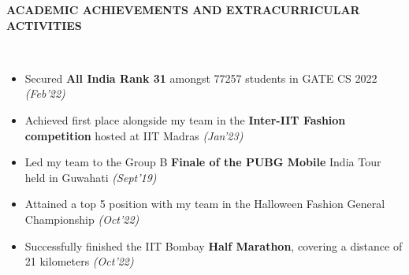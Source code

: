 \documentclass[a4paper,10pt]{article}
\newcommand{\resheading}[1]{{\small \colorbox{mygrey}{\begin{minipage}{0.99\textwidth}{\textbf{#1 \vphantom{p\^{E}}}}\end{minipage}}}}
\begin{document}
\resheading{\textbf{ACADEMIC ACHIEVEMENTS AND EXTRACURRICULAR ACTIVITIES}}\\
\begin{itemize}[noitemsep,nolistsep]

\item Secured \textbf{All India Rank 31} amongst 77257 students in GATE CS 2022 \emph{\hfill(Feb'22)}
\item Achieved first place alongside my team in the \textbf{Inter-IIT Fashion competition} hosted at IIT Madras \emph{\hfill(Jan'23)}
\item Led my team to the Group B \textbf{Finale of the PUBG Mobile} India Tour held in Guwahati \emph{\hfill(Sept'19)} 
\item Attained a top 5 position with my team in the Halloween Fashion General Championship \emph{\hfill(Oct'22)}
\item Successfully finished the IIT Bombay \textbf{Half Marathon}, covering a distance of 21 kilometers
\emph{\hfill(Oct'22)}
\end{itemize}
\end{document}

